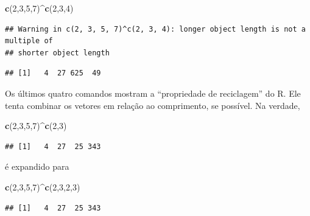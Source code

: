 \documentclass[
]{book}
\newenvironment{Shaded}{\begin{snugshade}}{\end{snugshade}}
\newcommand{\DecValTok}[1]{\textcolor[rgb]{0.00,0.00,0.81}{#1}}
\newcommand{\FunctionTok}[1]{\textcolor[rgb]{0.13,0.29,0.53}{\textbf{#1}}}
\newcommand{\NormalTok}[1]{#1}
\newcommand{\SpecialCharTok}[1]{\textcolor[rgb]{0.81,0.36,0.00}{\textbf{#1}}}
\begin{document}
\begin{Shaded}
\begin{Highlighting}[]
\FunctionTok{c}\NormalTok{(}\DecValTok{2}\NormalTok{,}\DecValTok{3}\NormalTok{,}\DecValTok{5}\NormalTok{,}\DecValTok{7}\NormalTok{)}\SpecialCharTok{\^{}}\FunctionTok{c}\NormalTok{(}\DecValTok{2}\NormalTok{,}\DecValTok{3}\NormalTok{,}\DecValTok{4}\NormalTok{)}
\end{Highlighting}
\end{Shaded}

\begin{verbatim}
## Warning in c(2, 3, 5, 7)^c(2, 3, 4): longer object length is not a multiple of
## shorter object length
\end{verbatim}

\begin{verbatim}
## [1]   4  27 625  49
\end{verbatim}

Os últimos quatro comandos mostram a ``propriedade de reciclagem'' do R. Ele tenta combinar os vetores em relação ao comprimento, se possível. Na verdade,

\begin{Shaded}
\begin{Highlighting}[]
\FunctionTok{c}\NormalTok{(}\DecValTok{2}\NormalTok{,}\DecValTok{3}\NormalTok{,}\DecValTok{5}\NormalTok{,}\DecValTok{7}\NormalTok{)}\SpecialCharTok{\^{}}\FunctionTok{c}\NormalTok{(}\DecValTok{2}\NormalTok{,}\DecValTok{3}\NormalTok{)}
\end{Highlighting}
\end{Shaded}

\begin{verbatim}
## [1]   4  27  25 343
\end{verbatim}

é expandido para

\begin{Shaded}
\begin{Highlighting}[]
\FunctionTok{c}\NormalTok{(}\DecValTok{2}\NormalTok{,}\DecValTok{3}\NormalTok{,}\DecValTok{5}\NormalTok{,}\DecValTok{7}\NormalTok{)}\SpecialCharTok{\^{}}\FunctionTok{c}\NormalTok{(}\DecValTok{2}\NormalTok{,}\DecValTok{3}\NormalTok{,}\DecValTok{2}\NormalTok{,}\DecValTok{3}\NormalTok{)}
\end{Highlighting}
\end{Shaded}

\begin{verbatim}
## [1]   4  27  25 343
\end{verbatim}
\end{document}
